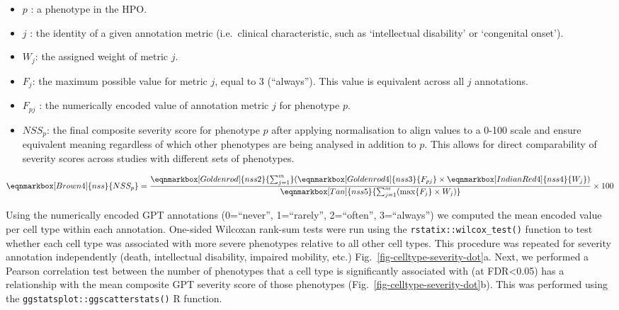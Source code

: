 \documentclass[
]{article}
\begin{document}
\begin{itemize}
\item
  \(p\) : a phenotype in the HPO.
\item
  \(j\) : the identity of a given annotation metric (i.e.~clinical
  characteristic, such as `intellectual disability' or `congenital
  onset').
\item
  \(W_j\): the assigned weight of metric \(j\).
\item
  \(F_j\): the maximum possible value for metric \(j\), equal to 3
  (``always''). This value is equivalent across all \(j\) annotations.
\item
  \(F_{pj}\) : the numerically encoded value of annotation metric \(j\)
  for phenotype \(p\).
\item
  \(NSS_p\): the final composite severity score for phenotype \(p\)
  after applying normalisation to align values to a 0-100 scale and
  ensure equivalent meaning regardless of which other phenotypes are
  being analysed in addition to \(p\). This allows for direct
  comparability of severity scores across studies with different sets of
  phenotypes.
\end{itemize}

\hfill\break
\hfill\break

\begin{equation*}
  \eqnmarkbox[Brown4]{nss}{NSS_p}
  =
  \frac{ 
    \eqnmarkbox[Goldenrod]{nss2}{\sum_{j=1}^{m}} 
    (
      \eqnmarkbox[Goldenrod4]{nss3}{F_{pj}}
      \times 
      \eqnmarkbox[IndianRed4]{nss4}{W_j}
    )
    }{
    \eqnmarkbox[Tan]{nss5}{\sum_{j=1}^{m}(\max\{F_j\} \times W_j)} 
  } \times 100
\end{equation*}

\hfill\break

Using the numerically encoded GPT annotations (0=``never'',
1=``rarely'', 2=``often'', 3=``always'') we computed the mean encoded
value per cell type within each annotation. One-sided Wilcoxan rank-sum
tests were run using the \texttt{rstatix::wilcox\_test()} function to
test whether each cell type was associated with more severe phenotypes
relative to all other cell types. This procedure was repeated for
severity annotation independently (death, intellectual disability,
impaired mobility, etc.) Fig.~\ref{fig-celltype-severity-dot}a. Next, we
performed a Pearson correlation test between the number of phenotypes
that a cell type is significantly associated with (at FDR\textless0.05)
has a relationship with the mean composite GPT severity score of those
phenotypes (Fig.~\ref{fig-celltype-severity-dot}b). This was performed
using the \texttt{ggstatsplot::ggscatterstats()} R function.
\end{document}
